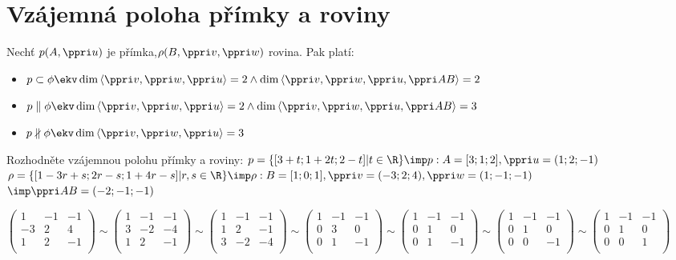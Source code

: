 
\section{Vzájemná poloha přímky a roviny}
Nechť $p(A,\ve u)$ je přímka,$\rho(B,\ve v,\ve w)$ rovina. Pak platí:
\begin{itemize}
	\item $p \subset \phi \ekv \dim\<\ve v, \ve w,\ve u\> = 2 \land \dim \<\ve v,\ve w,\ve u,\ve{AB}\> = 2$
	\item $p \parallel \phi \ekv \dim\<\ve v, \ve w,\ve u\> = 2 \land \dim \<\ve v,\ve w,\ve u,\ve{AB}\> = 3$
	\item $p \nparallel \phi \ekv \dim\<\ve v, \ve w,\ve u\> = 3$
\end{itemize}

\Pr Rozhodněte vzájemnou polohu přímky a roviny:
$ p = \{[3+t;1+2t;2-t]|t\in\R\}  \imp p: A=[3;1;2],\ve u = (1;2;-1)$\\
$ \rho = \{[1-3r+s;2r-s;1+4r-s]|r,s\in\R\} \imp \rho: B = [1;0;1],\ve v = (-3;2;4),\ve w = (1;-1;-1)$\\
$\imp \ve{AB}  = (-2;-1;-1) $

 $\begin{pmatrix}
	 1 &-1 & -1 \\ 
	 -3 &2 & 4 \\ 
	 1 &2 & -1 \\ 
 \end{pmatrix}
 \sim
 \begin{pmatrix}
	 1 &-1 & -1 \\ 
	 3 &-2 & -4 \\ 
	 1 &2 & -1 \\ 
 \end{pmatrix}
 \sim
 \begin{pmatrix}
	 1 &-1 & -1 \\ 
	 1 &2 & -1 \\ 
	 3 &-2 & -4 \\ 
 \end{pmatrix}
 \sim
 \begin{pmatrix}
	 1 &-1 & -1 \\ 
	 0 &3 & 0 \\ 
	 0 &1 & -1 \\ 
 \end{pmatrix}
 \sim
 \begin{pmatrix}
	 1 &-1 & -1 \\ 
	 0 &1 & 0 \\ 
	 0 &1 & -1 \\ 
 \end{pmatrix}
 \sim
 \begin{pmatrix}
	 1 &-1 & -1 \\ 
	 0 &1 & 0 \\ 
	 0 &0 & -1 \\ 
 \end{pmatrix}
 \sim
 \begin{pmatrix}
	 1 &-1 & -1 \\ 
	 0 &1 & 0 \\ 
	 0 &0 & 1 \\ 
 \end{pmatrix}
  $ 

